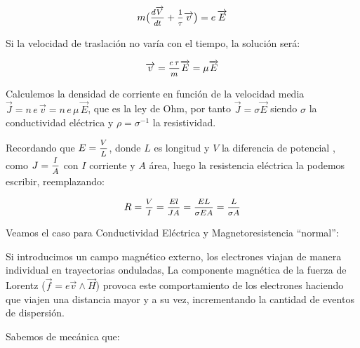 \begin{equation}
	m\big(\mfrac{d\overrightarrow{V}}{dt}+\mfrac{1}{\tau} \overrightarrow{v} \big)= e\, \overrightarrow{E}
\end{equation}

Si la velocidad de traslación no varía con el tiempo, la solución será:

\begin{equation}
	\overrightarrow{v} = \mfrac{e\,\tau}{m} \overrightarrow{E} = \mu \overrightarrow{E}
\end{equation}

Calculemos la densidad de corriente en función de la velocidad media $\overrightarrow{J}=n\,e\,\overrightarrow{v} = n\,e\,\mu \,\overrightarrow{E}$, que es la ley de Ohm, por tanto $\overrightarrow{J}=\sigma \overrightarrow{E}$ siendo $\sigma$ la conductividad eléctrica y $\rho=\sigma^{-1}$ la resistividad.

Recordando que $E=\mfrac{V}{L}$, donde $L$ es longitud y $V$ la diferencia de potencial , como $J=\mfrac{I}{A}$ con $I$ corriente y $A$ área, luego la resistencia eléctrica la podemos escribir, reemplazando:

\begin{equation}
	R= \mfrac{V}{I}= \mfrac{El}{JA}= \mfrac{EL}{\sigma E A}= \mfrac{L}{\sigma A}
\end{equation}

Veamos el caso para Conductividad Eléctrica y Magnetoresistencia “normal”:

Si introducimos un campo magnético externo, los electrones viajan de manera individual en trayectorias onduladas, La componente magnética de la fuerza de Lorentz ($\overrightarrow{f}=e \overrightarrow{v}\wedge\overrightarrow{H}$) provoca este comportamiento de los electrones haciendo que viajen una distancia mayor y a su vez, incrementando la cantidad de eventos de dispersión. 

Sabemos de mecánica que:

